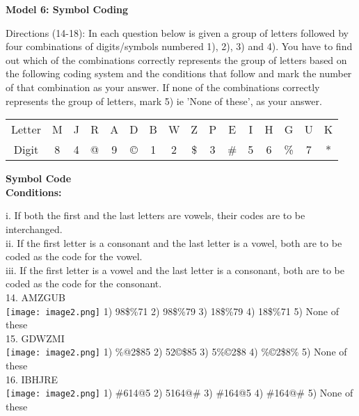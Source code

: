 \documentclass[
]{article}
\begin{document}
\textbf{Model 6: Symbol Coding}

Directions (14-18): In each question below is given a group of letters followed by four combinations of digits/symbols numbered 1), 2), 3) and 4). You have to find out which of the combinations correctly represents the group of letters based on the following coding system and
the conditions that follow and mark the number of that combination as your answer. If none of
the combinations correctly represents the group of letters, mark 5) ie 'None of these', as your
answer.

\begin{tabular}{ c c c c c c c c c c c c c c c c}
 Letter & M & J & R & A & D & B & W & Z & P & E & I & H & G &U& K \\ Digit &8 &4 &@ &9 &© &1 &2 &\$ &3 &\# &5 &6 &\% &7 &* \\  
\end{tabular}
\textbf{Symbol Code\\
Conditions:}

i. If both the first and the last letters are vowels, their codes are to be interchanged.\\
ii. If the first letter is a consonant and the last letter is a vowel, both are to be coded as the code
for the vowel.\\
iii. If the first letter is a vowel and the last letter is a consonant, both are to be coded as the code
for the consonant.\\

14. AMZGUB\\
\texttt{[image: image2.png]}
1) 98\$\%71 \hspace{2mm}2) 98\$\%79 \hspace{2mm}3) 18\$\%79 \hspace{2mm}4) 18\$\%71 \hspace{2mm}5) None of these\\

15. GDWZMI\\
\texttt{[image: image2.png]}
1) \%@2\$85 \hspace{2mm}2) 52©\$85 \hspace{2mm}3) 5\%©2\$8 \hspace{2mm}4) \%©2\$8\% \hspace{2mm}5) None of these\\

16. IBHJRE\\
\texttt{[image: image2.png]}
1) \#614@5 \hspace{2mm}2) 5164@\# \hspace{2mm}3) \#164@5 \hspace{2mm}4) \#164@\# \hspace{2mm}5) None of these\\
\end{document}
